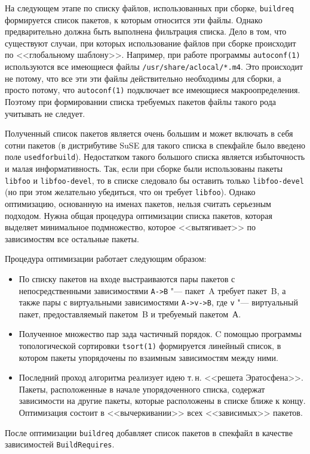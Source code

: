 \documentclass[russian,a4paper,12pt,titlepage]{article}
\begin{document}
На следующем этапе по списку файлов, использованных при сборке, \verb|buildreq| формируется список пакетов, к которым
относится эти файлы.  Однако предварительно должна быть выполнена фильтрация списка.  Дело в том, что существуют
случаи, при которых использование файлов при сборке происходит по <<глобальному шаблону>>.  Например, при работе
программы \verb|autoconf(1)| используются все имеющиеся файлы \verb|/usr/share/aclocal/*.m4|.  Это происходит не потому,
что все эти эти файлы действительно необходимы для сборки, а просто потому, что \verb|autoconf(1)| подключает все имеющиеся
макроопределения.  Поэтому при формировании списка требуемых пакетов файлы такого рода учитывать не следует.

Полученный список пакетов является очень большим и может включать в себя сотни пакетов (в дистрибутиве SuSE
для такого списка в спекфайле было введено поле \verb|usedforbuild|).  Недостатком такого большого списка
является избыточность и малая информативность.  Так, если при сборке были использованы пакеты \verb|libfoo|
и \verb|libfoo-devel|, то в списке следовало бы оставить только \verb|libfoo-devel| (но при этом желательно убедиться,
что он требует \verb|libfoo|).  Однако оптимизацию, основанную на именах пакетов, нельзя считать серьезным подходом.
Нужна общая процедура оптимизации списка пакетов, которая выделяет минимальное подмножество, которое <<вытягивает>>
по зависимостям все остальные пакеты.

Процедура оптимизации работает следующим образом:
\begin{itemize}
\item По списку пакетов на входе выстраиваются пары пакетов с непосредственными
зависимостями \verb|A->B| "--- пакет~A требует пакет~B, а также пары с виртуальными зависимостями \verb|A->v->B|,
где \verb|v| "--- виртуальный пакет, предоставляемый пакетом~B и требуемый пакетом~А.
\item Полученное множество пар зада частичный порядок.  C помощью программы топологической
сортировки \verb|tsort(1)| формируется линейный список, в котором пакеты упорядочены по
взаимным зависимостям между ними.
\item Последний проход алгоритма реализует идею т.\,н. <<решета Эратосфена>>.
Пакеты, расположенные в начале упорядоченного списка, содержат зависимости
на другие пакеты, которые расположены в списке ближе к концу.  Оптимизация
состоит в <<вычеркивании>> всех <<зависимых>> пакетов.
\end{itemize}

После оптимизации \verb|buildreq| добавляет список пакетов в спекфайл в качестве зависимостей \verb|BuildRequires|.
\end{document}

